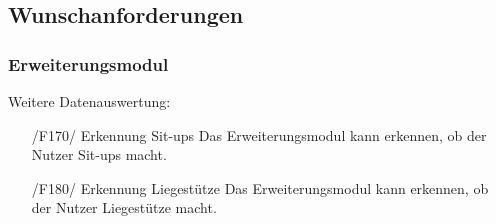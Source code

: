 \documentclass[a4paper,12pt]{article}
\begin{document}
  \subsection{Wunschanforderungen}
    \subsubsection{Erweiterungsmodul}
      \textsf{Weitere Datenauswertung:}
      \begin{itemize}
      \item[/F170/] \textsf{Erkennung Sit-ups} Das Erweiterungsmodul kann erkennen, ob der Nutzer Sit-ups macht.
      \item[/F180/] \textsf{Erkennung Liegestütze} Das Erweiterungsmodul kann erkennen, ob der Nutzer Liegestütze macht.
      \end{itemize} 
\end{document}
